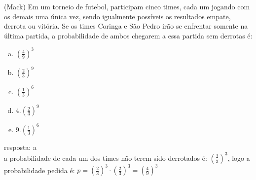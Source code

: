 \begin{ex}
   (Mack) Em um torneio de futebol, participam cinco times, cada um jogando com os demais uma única vez, sendo igualmente possíveis os resultados empate, derrota ou vitória. Se os times Coringa e São Pedro irão se enfrentar somente na última partida, a probabilidade de ambos chegarem a essa partida sem derrotas é:
     \begin{enumerate}  [(a)]
         \item $(\frac{4}{9})^3$
         \item $(\frac{2}{3})^9$
         \item $(\frac{1}{3})^6$
         \item $4.(\frac{2}{3})^9$
         \item $9.(\frac{1}{3})^6$
     \end{enumerate}
       \begin{sol}
        resposta: a \\
        a probabilidade de cada um dos times não terem sido derrotados é: $(\frac{2}{3})^3$, logo a probabilidade pedida é:\hspace{0,4cm} $p=(\frac{2}{3})^3\cdot(\frac{2}{3})^3=(\frac{4}{9})^3$
       \end{sol}
 \end{ex}